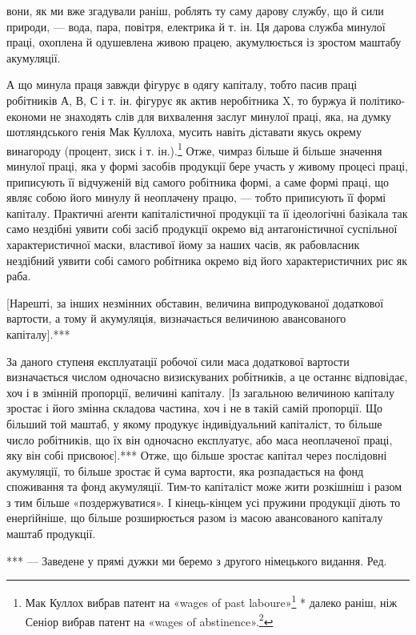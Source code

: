 \parcont{}  %
вони, як ми вже згадували раніш, роблять ту саму дарову службу,
що й сили природи, — вода, пара, повітря, електрика й т. ін.
Ця дарова служба минулої праці, охоплена й одушевлена живою
працею, акумулюється із зростом маштабу акумуляції.

А що минула праця завжди фігурує в одягу капіталу, тобто
пасив праці робітників А, В, С і т. ін. фігурує як актив неробітника
X, то буржуа й політико-економи не знаходять слів
для вихвалення заслуг минулої праці, яка, на думку шотляндського
генія Мак Куллоха, мусить навіть діставати якусь окрему
винагороду (процент, зиск і т. ін.).\footnote{
Мак Куллох вибрав патент на «wages of past laboure»\footnote*{
— винагороду за минулу працю. Ред.
} * далеко
раніш, ніж Сеніор вибрав патент на «wages of abstinence».\footnote*{
— винагороду за поздержливість. Ред.
}
} Отже, чимраз більше й
більше значення минулої праці, яка у формі засобів продукції
бере участь у живому процесі праці, приписують її відчуженій
від самого робітника формі, а саме формі праці, що являє собою
його минулу й неоплачену працю, — тобто приписують її
формі капіталу. Практичні аґенти капіталістичної продукції
та її ідеологічні базікала так само нездібні уявити собі засіб
продукції окремо від антагоністичної суспільної характеристичної
маски, властивої йому за наших часів, як рабовласник
нездібний уявити собі самого робітника окремо від його характеристичних
рис як раба.

[Нарешті, за інших незмінних обставин, величина випродукованої
додаткової вартости, а тому й акумуляція, визначається
величиною авансованого капіталу].***

За даного ступеня експлуатації робочої сили маса додаткової
вартости визначається числом одночасно визискуваних робітників,
а це останнє відповідає, хоч і в змінній пропорції, величині
капіталу. [Із загальною величиною капіталу зростає і його
змінна складова частина, хоч і не в такій самій пропорції. Що
більший той маштаб, у якому продукує індивідуальний капіталіст,
то більше число робітників, що їх він одночасно експлуатує,
або маса неоплаченої праці, яку він собі присвоює].*** Отже,
що більше зростає капітал через послідовні акумуляції, то більше
зростає й сума вартости, яка розпадається на фонд споживання
та фонд акумуляції. Тим-то капіталіст може жити розкішніш
і разом з тим більше «поздержуватися». І кінець-кінцем усі
пружини продукції діють то енерґійніше, що більше розширюється
разом із масою авансованого капіталу маштаб продукції.

*** — Заведене у прямі дужки ми беремо з другого німецького видання.
Ред.
